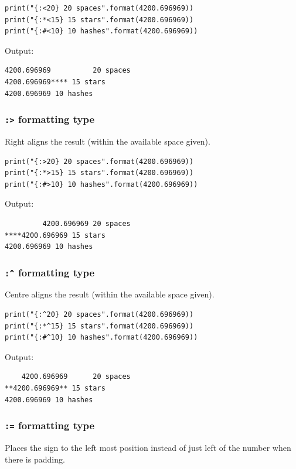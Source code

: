 \documentclass[11pt]{article}
\begin{document}
\begin{verbatim}
print("{:<20} 20 spaces".format(4200.696969))
print("{:*<15} 15 stars".format(4200.696969))
print("{:#<10} 10 hashes".format(4200.696969))
\end{verbatim}

 \noindent Output:

\begin{verbatim}
4200.696969          20 spaces
4200.696969**** 15 stars
4200.696969 10 hashes
\end{verbatim}


\subsubsection{\texttt{:>} formatting type}
\label{sec:org90d34fa}
Right aligns the result (within the available space given).

\begin{verbatim}
print("{:>20} 20 spaces".format(4200.696969))
print("{:*>15} 15 stars".format(4200.696969))
print("{:#>10} 10 hashes".format(4200.696969))
\end{verbatim}

 \noindent Output:

\begin{verbatim}
         4200.696969 20 spaces
****4200.696969 15 stars
4200.696969 10 hashes
\end{verbatim}

\subsubsection{\texttt{:\textasciicircum{}} formatting type}
\label{sec:org9d1d04b}
Centre aligns the result (within the available space given).

\begin{verbatim}
print("{:^20} 20 spaces".format(4200.696969))
print("{:*^15} 15 stars".format(4200.696969))
print("{:#^10} 10 hashes".format(4200.696969))
\end{verbatim}

 \noindent Output:

\begin{verbatim}
    4200.696969      20 spaces
**4200.696969** 15 stars
4200.696969 10 hashes
\end{verbatim}

\subsubsection{\texttt{:=} formatting type}
\label{sec:org23bce70}
Places the sign to the left most position instead of just left of the number when there is padding.
\end{document}
